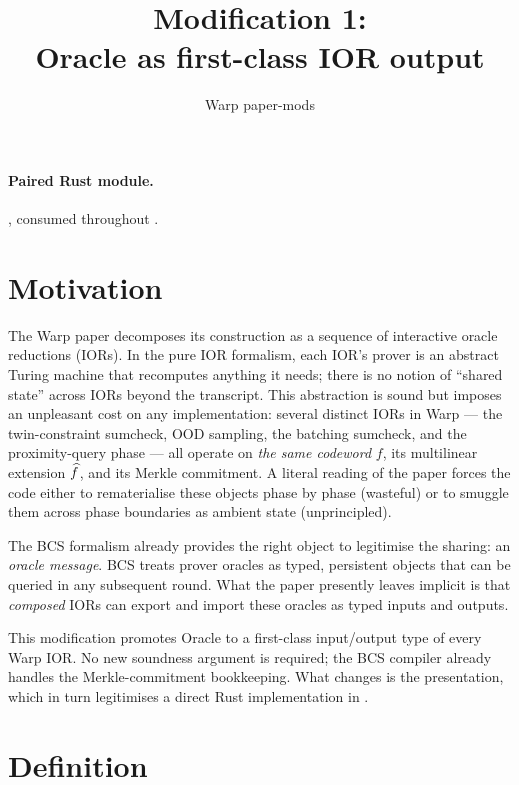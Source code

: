 \documentclass{article}
\title{Modification 1: \\ Oracle as first-class IOR output}
\author{Warp paper-mods}
\date{}
\begin{document}
\maketitle

\paragraph{Paired Rust module.} , consumed
throughout .

\section{Motivation}

The Warp paper decomposes its construction as a sequence of interactive
oracle reductions (IORs). In the pure IOR formalism, each IOR's prover is an
abstract Turing machine that recomputes anything it needs; there is no notion
of ``shared state'' across IORs beyond the transcript. This abstraction is
sound but imposes an unpleasant cost on any implementation: several distinct
IORs in Warp --- the twin-constraint sumcheck, OOD sampling, the batching
sumcheck, and the proximity-query phase --- all operate on \emph{the same
codeword} \(f\), its multilinear extension \(\widehat{f}\), and its Merkle
commitment. A literal reading of the paper forces the code either to
rematerialise these objects phase by phase (wasteful) or to smuggle them
across phase boundaries as ambient state (unprincipled).

The BCS formalism already provides the right object to legitimise the
sharing: an \emph{oracle message}. BCS treats prover oracles as typed,
persistent objects that can be queried in any subsequent round. What the
paper presently leaves implicit is that \emph{composed} IORs can export and
import these oracles as typed inputs and outputs.

This modification promotes Oracle to a first-class input/output type of every
Warp IOR. No new soundness argument is required; the BCS compiler already
handles the Merkle-commitment bookkeeping. What changes is the presentation,
which in turn legitimises a direct Rust implementation in
.

\section{Definition}
\end{document}
